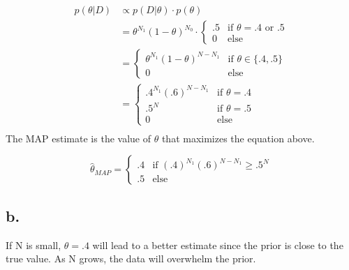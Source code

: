 \documentclass{article}
\begin{document}
\begin{align*}
  p(\theta|D) &\propto p(D|\theta) \cdot p(\theta) \\
              &= \theta^{N_1}(1 - \theta)^{N_0} \cdot
                \left\{ \begin{array}{ll}
                          .5 & \mbox{if $\theta = .4 \text{ or } .5$} \\
                          0 & \mbox{else} \end{array} \right. \\
              &= \left\{ \begin{array}{ll}
                                 \theta^{N_1}(1 - \theta)^{N - N_1} &
                                                                      \mbox{if
                                                                      $\theta
                                                                      \in
                                                                      \{.4,
                                                                      .5\}$} \\
                                 0 & \mbox{else} \end{array} \right.
  \\
              &= \left\{ \begin{array}{ll}
                           .4^{N_1}(.6)^{N - N_1} & \mbox{if $\theta = .4$} \\
                           .5^N & \mbox{if $\theta = .5$} \\
                           0 & \mbox{else} \end{array} \right.
  \\
\end{align*}
The MAP estimate is the value of $\theta$ that maximizes the equation above.

\begin{equation*}
  \hat{\theta}_{MAP} = \left\{ \begin{array}{ll}
                           .4 & \mbox{if $(.4)^{N_1} (.6)^{N-N_1} \ge .5^N$} \\
                           .5 & \mbox{else} \end{array} \right.
\end{equation*}

\subsection{b.}
If N is small, $\theta = .4$ will lead to a better estimate since the
prior is close to the true value. As N grows, the data will overwhelm
the prior.
\end{document}

